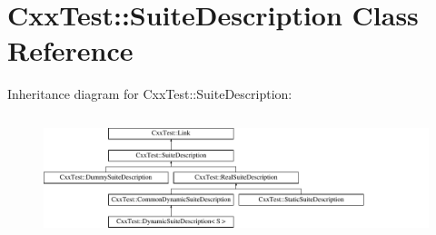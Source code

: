 \hypertarget{classCxxTest_1_1SuiteDescription}{\section{Cxx\-Test\-:\-:Suite\-Description Class Reference}
\label{classCxxTest_1_1SuiteDescription}
}
Inheritance diagram for Cxx\-Test\-:\-:Suite\-Description\-:\begin{figure}[H]
\begin{center}
\leavevmode
\includegraphics[height=3.603604cm]{classCxxTest_1_1SuiteDescription}
\end{center}
\end{figure}
